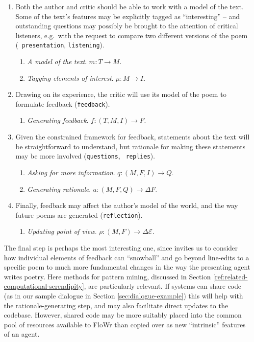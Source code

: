\begin{enumerate}[label=\Roman*.]
\item Both the author and critic should be able to work with a model
  of the text.  Some of the text's features may be explicitly tagged
  as ``interesting'' -- and outstanding questions may possibly be
  brought to the attention of critical listeners, e.g.~with the
  request to compare two different versions of the poem ({\tt
    presentation}, {\tt listening}).
\begin{enumerate}[label=\arabic*.]
\item \emph{A model of the text}. $m: T\rightarrow M$.
\item \emph{Tagging elements of interest}. $\mu: M\rightarrow I$.
\end{enumerate}
\item Drawing on its experience, the critic will use its model of the
  poem to formulate feedback ({\tt feedback}).
\begin{enumerate}[label=\arabic*.]
\item \emph{Generating feedback}. $f: (T,M,I)\rightarrow F$.
\end{enumerate}
\item Given the constrained framework for feedback, statements about
  the text will be straightforward to understand, but rationale for
  making these statements may be more involved ({\tt questions}, {\tt
    replies}).
\begin{enumerate}[label=\arabic*.]
\item \emph{Asking for more information}. $q: (M,F,I) \rightarrow Q$.
\item \emph{Generating rationale}. $a: (M,F,Q) \rightarrow \Delta F$.
\end{enumerate}
\item Finally, feedback may affect the author's model of the world, and the way future poems are generated ({\tt reflection}).
\begin{enumerate}[label=\arabic*.]
\item \emph{Updating point of view}. $\rho: (M,F) \rightarrow \Delta\mathcal{E}$.
\end{enumerate}
\end{enumerate}

The final step is perhaps the most interesting one, since invites us
to consider how individual elements of feedback can ``snowball'' and
go beyond line-edits to a specific poem to much more fundamental
changes in the way the presenting agent writes poetry.  Here methods
for pattern mining, discussed in Section
\ref{ref:related-computational-serendipity}, are particularly relevant.
If systems can share code (as in our sample dialogue in Section
\ref{sec:dialogue-example}) this will help with the
rationale-generating step, and may also facilitate direct updates to
the codebase.  However, shared code may be more suitably placed into
the common pool of resources available to FloWr than copied over as
new ``intrinsic'' features of an agent.

